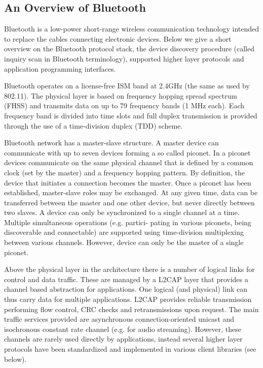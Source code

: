 \subsection{An Overview of Bluetooth}

Bluetooth is a low-power short-range wireless communication technology intended to replace the cables connecting electronic devices. Below we give a short 
overview on the Bluetooth protocol stack, the device discovery procedure (called inquiry scan in Bluetooth terminology), supported higher 
layer protocols and application programming interfaces.

Bluetooth operates on a license-free ISM band at 2.4GHz (the same as used by 802.11). The physical layer is based on frequency hopping spread spectrum (FHSS)
and transmits data on up to 79 frequency bands (1 MHz each). Each frequency band is divided into time slots and full duplex transmission is provided through the use of
a time-division duplex (TDD) scheme.

Bluetooth network has a master-slave structure. A master device can communicate with up to seven devices forming a so called piconet. In a piconet devices communicate
on the same physical channel that is defined by a common clock (set by the master) and a frequency hopping pattern. By definition, the device that initiates a connection
becomes the master. Once a piconet has been established, master-slave roles may be exchanged. At any given time, data can be transferred between the master and one
other device, but never directly between two slaves. A device can only be synchronized to a single channel at a time. Multiple simultaneous operations (e.g. partici-
pating in various piconets, being discoverable and connectable) are supported using time-division multiplexing between various channels. However, device can only be
the master of a single piconet.

Above the physical layer in the architecture there is a number of logical links for control and data traffic. These are managed by a L2CAP layer that provides a channel based abstraction for applications. One logical (and physical) link can thus carry data for multiple applications. L2CAP provides reliable transmission performing flow
control, CRC checks and retransmissions upon request. The main traffic services provided are asynchronous connection-oriented unicast and isochronous constant rate
channel (e.g. for audio streaming). However, these channels are rarely used directly by applications, instead several higher layer protocols have been standardized and
implemented in various client libraries (see below). 

